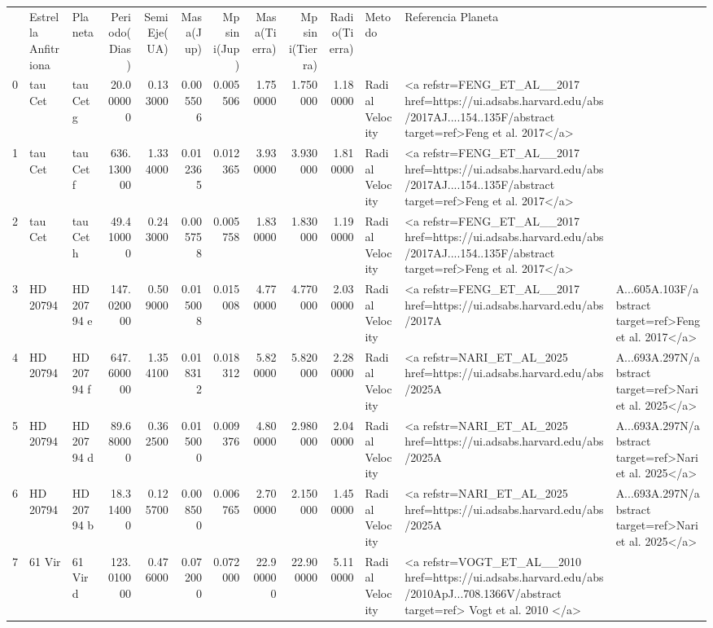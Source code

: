 \begin{tabular}{lllrrrrrrrll}
 & Estrella Anfitriona & Planeta & Periodo(Dias) & Semi Eje(UA) & Masa(Jup) & Mp sin i(Jup) & Masa(Tierra) & Mp sin i(Tierra) & Radio(Tierra) & Metodo & Referencia Planeta \\
0 & tau Cet & tau Cet g & 20.000000 & 0.133000 & 0.005506 & 0.005506 & 1.750000 & 1.750000 & 1.180000 & Radial Velocity & <a refstr=FENG_ET_AL__2017 href=https://ui.adsabs.harvard.edu/abs/2017AJ....154..135F/abstract target=ref>Feng et al. 2017</a> \\
1 & tau Cet & tau Cet f & 636.130000 & 1.334000 & 0.012365 & 0.012365 & 3.930000 & 3.930000 & 1.810000 & Radial Velocity & <a refstr=FENG_ET_AL__2017 href=https://ui.adsabs.harvard.edu/abs/2017AJ....154..135F/abstract target=ref>Feng et al. 2017</a> \\
2 & tau Cet & tau Cet h & 49.410000 & 0.243000 & 0.005758 & 0.005758 & 1.830000 & 1.830000 & 1.190000 & Radial Velocity & <a refstr=FENG_ET_AL__2017 href=https://ui.adsabs.harvard.edu/abs/2017AJ....154..135F/abstract target=ref>Feng et al. 2017</a> \\
3 & HD 20794 & HD 20794 e & 147.020000 & 0.509000 & 0.015008 & 0.015008 & 4.770000 & 4.770000 & 2.030000 & Radial Velocity & <a refstr=FENG_ET_AL__2017 href=https://ui.adsabs.harvard.edu/abs/2017A&A...605A.103F/abstract target=ref>Feng et al. 2017</a> \\
4 & HD 20794 & HD 20794 f & 647.600000 & 1.354100 & 0.018312 & 0.018312 & 5.820000 & 5.820000 & 2.280000 & Radial Velocity & <a refstr=NARI_ET_AL_2025 href=https://ui.adsabs.harvard.edu/abs/2025A&A...693A.297N/abstract target=ref>Nari et al. 2025</a> \\
5 & HD 20794 & HD 20794 d & 89.680000 & 0.362500 & 0.015000 & 0.009376 & 4.800000 & 2.980000 & 2.040000 & Radial Velocity & <a refstr=NARI_ET_AL_2025 href=https://ui.adsabs.harvard.edu/abs/2025A&A...693A.297N/abstract target=ref>Nari et al. 2025</a> \\
6 & HD 20794 & HD 20794 b & 18.314000 & 0.125700 & 0.008500 & 0.006765 & 2.700000 & 2.150000 & 1.450000 & Radial Velocity & <a refstr=NARI_ET_AL_2025 href=https://ui.adsabs.harvard.edu/abs/2025A&A...693A.297N/abstract target=ref>Nari et al. 2025</a> \\
7 & 61 Vir & 61 Vir d & 123.010000 & 0.476000 & 0.072000 & 0.072000 & 22.900000 & 22.900000 & 5.110000 & Radial Velocity & <a refstr=VOGT_ET_AL__2010 href=https://ui.adsabs.harvard.edu/abs/2010ApJ...708.1366V/abstract target=ref> Vogt et al. 2010 </a> \\

\end{tabular}
